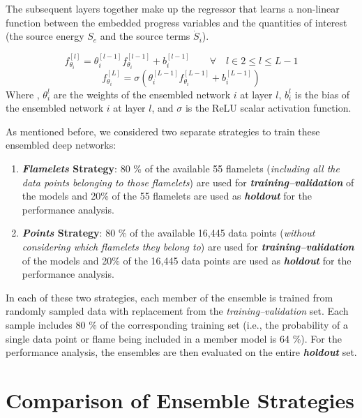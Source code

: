 \documentclass[conf]{new-aiaa}
\begin{document}
The subsequent layers together make up the regressor that learns a non-linear function between the embedded progress variables and the quantities of interest (the source energy $S_e$ and the source terms $\dot{S}_i$).

\begin{equation}
f_{\theta_i}^{[l]} = \theta_i^{[l-1]}f_{\theta_i}^{[l-1]}+b_i^{[l-1]} \qquad \forall  \quad l   \in 2\leq l \leq L-1
\end{equation}
\begin{equation}
f_{\theta_i}^{[L]} = \sigma(\theta_i^{[L-1]}f_{\theta_i}^{[L-1]}+b_i^{[L-1]})
\end{equation}
Where , $\theta_i^{l}$ are the weights of the ensembled network $i$ at layer $l$, $b_i^{l}$ is the bias of the ensembled network $i$ at layer $l$, and $\sigma$ is the ReLU scalar activation function.


As mentioned before, we considered two separate strategies to train these ensembled deep networks: 
\begin{enumerate}
    \item \textbf{\textit{Flamelets} Strategy}: 80 \% of the available 55 flamelets (\textit{including all the data points belonging to those flamelets}) are used for \textbf{\textit{training--validation}} of the models and 20\% of the 55 flamelets are used as \textbf{\textit{holdout}} for the performance analysis.
    
    \item \textbf{\textit{Points} Strategy}: 80 \% of the available 16,445 data points (\textit{without considering which flamelets they belong to}) are used for \textbf{\textit{training--validation}} of the models and 20\% of the 16,445 data points are used as \textbf{\textit{holdout}} for the performance analysis.
\end{enumerate}
In each of these two strategies, each member of the ensemble is trained from randomly sampled data with replacement from the \textit{training--validation} set. Each sample includes 80 \% of the corresponding training set (i.e., the probability of a single data point or flame being included in a member model is 64 \%). For the performance analysis, the ensembles are then evaluated on the entire \textbf{\textit{holdout}} set.


\section{Comparison of Ensemble Strategies}
\end{document}
